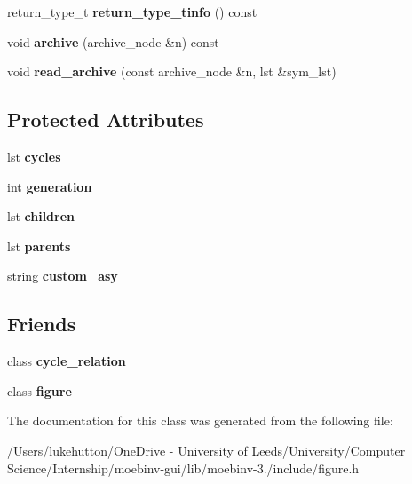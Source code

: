 \begin{DoxyCompactItemize}
return\+\_\+type\+\_\+t {\bfseries return\+\_\+type\+\_\+tinfo} () const
\item 
\mbox{\label{class_moeb_inv_1_1cycle__node_aed6b7101a72ebe6e7d479fd74420bda2}} 
void {\bfseries archive} (archive\+\_\+node \&n) const
\item 
\mbox{\label{class_moeb_inv_1_1cycle__node_af9fd14be29696726f9cd15c0fb106fda}} 
void {\bfseries read\+\_\+archive} (const archive\+\_\+node \&n, lst \&sym\+\_\+lst)
\end{DoxyCompactItemize}
\subsection*{Protected Attributes}
\begin{DoxyCompactItemize}
\item 
\mbox{\label{class_moeb_inv_1_1cycle__node_ae1f5316d67066b275f9c50c6791d2a25}} 
lst {\bfseries cycles}
\item 
\mbox{\label{class_moeb_inv_1_1cycle__node_a85d78c21e3b9d1225f254d9d726be2dc}} 
int {\bfseries generation}
\item 
\mbox{\label{class_moeb_inv_1_1cycle__node_aeea2ab8582613cc50606089bb7c8fed8}} 
lst {\bfseries children}
\item 
\mbox{\label{class_moeb_inv_1_1cycle__node_ab648167bc5d4d184714e74f494f8acbd}} 
lst {\bfseries parents}
\item 
\mbox{\label{class_moeb_inv_1_1cycle__node_a140cf77b9e0d077cd1ab70f86dc5fc5a}} 
string {\bfseries custom\+\_\+asy}
\end{DoxyCompactItemize}
\subsection*{Friends}
\begin{DoxyCompactItemize}
\item 
\mbox{\label{class_moeb_inv_1_1cycle__node_ab77da22cfd9a585b10b4077bd20dafed}} 
class {\bfseries cycle\+\_\+relation}
\item 
\mbox{\label{class_moeb_inv_1_1cycle__node_ac46ec1ee00928c9cde5b63a7edba7b7a}} 
class {\bfseries figure}
\end{DoxyCompactItemize}


The documentation for this class was generated from the following file\+:\begin{DoxyCompactItemize}
\item 
/\+Users/lukehutton/\+One\+Drive -\/ University of Leeds/\+University/\+Computer Science/\+Internship/moebinv-\/gui/lib/moebinv-\/3./include/figure.\+h\end{DoxyCompactItemize}
